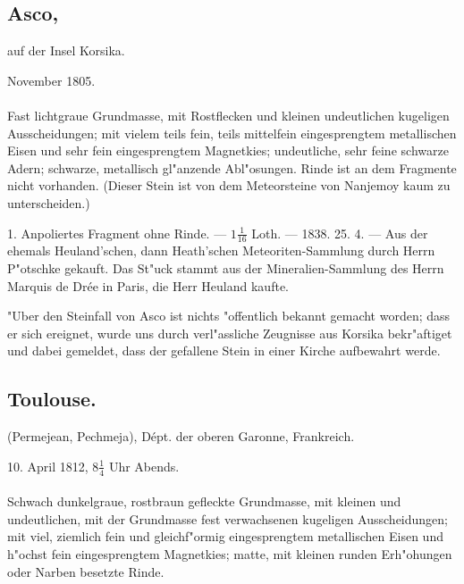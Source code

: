 \documentclass[a4paper, 11pt, oneside, polutonikogreek, german]{article}
\begin{document}
\subsection[Asco.]{Asco,}
\begin{center}
\small
auf der Insel Korsika.

November 1805.
\end{center}
\paragraph{}
Fast lichtgraue Grundmasse, mit Rostflecken und kleinen undeutlichen kugeligen Ausscheidungen; mit vielem teils fein, teils mittelfein eingesprengtem metallischen Eisen und sehr fein eingesprengtem Magnetkies; undeutliche, sehr feine schwarze Adern; schwarze, metallisch gl"anzende Abl"osungen. Rinde ist an dem Fragmente nicht vorhanden. (Dieser Stein ist von dem Meteorsteine von Nanjemoy kaum zu unterscheiden.)

1. Anpoliertes Fragment ohne Rinde. --- $1\frac{1}{16}$ Loth. --- 1838. 25. 4. --- Aus der ehemals Heuland'schen, dann Heath'schen Meteoriten-Sammlung durch Herrn P"otschke gekauft. Das St"uck stammt aus der Mineralien-Sammlung des Herrn Marquis de Drée in Paris, die Herr Heuland kaufte.

\setlength{\leftskip}{10mm}
\setlength{\parindent}{0pt}

{\footnotesize "Uber den Steinfall von Asco ist nichts "offentlich bekannt gemacht worden; dass er sich ereignet, wurde uns durch verl"assliche Zeugnisse aus Korsika bekr"aftiget und dabei gemeldet, dass der gefallene Stein in einer Kirche aufbewahrt werde.}

\setlength{\leftskip}{0pt}
\setlength{\parindent}{20pt}

\subsection{Toulouse.}
\begin{center}
\small
(Permejean, Pechmeja), Dépt. der oberen Garonne, Frankreich.

10. April 1812, $8\frac{1}{4}$ Uhr Abends.
\end{center}
\paragraph{}
Schwach dunkelgraue, rostbraun gefleckte Grundmasse, mit kleinen und undeutlichen, mit der Grundmasse fest verwachsenen kugeligen Ausscheidungen; mit viel, ziemlich fein und gleichf"ormig eingesprengtem metallischen Eisen und h"ochst fein eingesprengtem Magnetkies; matte, mit kleinen runden Erh"ohungen oder Narben besetzte Rinde.
\end{document}
